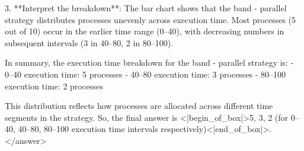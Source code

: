 3. **Interpret the breakdown**:  
   The bar chart shows that the band - parallel strategy distributes processes unevenly across execution time. Most processes (5 out of 10) occur in the earlier time range (0–40), with decreasing numbers in subsequent intervals (3 in 40–80, 2 in 80–100).  


In summary, the execution time breakdown for the band - parallel strategy is:  
- 0–40 execution time: 5 processes  
- 40–80 execution time: 3 processes  
- 80–100 execution time: 2 processes  

This distribution reflects how processes are allocated across different time segments in the strategy.  
So, the final answer is <|begin_of_box|>5, 3, 2 (for 0–40, 40–80, 80–100 execution time intervals respectively)<|end_of_box|>.</answer>